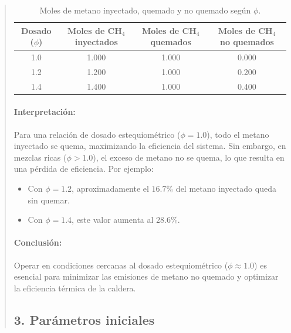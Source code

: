 \documentclass[11pt, a4paper]{article}
\begin{document}
\begin{quote}
\begin{center}
\begin{adjustwidth}{-1.7cm}{-1cm}
\begin{table}[h!]
\centering
\begin{tabular}{|c|c|c|c|}
\hline
\textbf{Dosado (\(\phi\))} & \textbf{Moles de CH$_4$ inyectados} & \textbf{Moles de CH$_4$ quemados} & \textbf{Moles de CH$_4$ no quemados} \\ \hline
1.0                        & 1.000                               & 1.000                            & 0.000                              \\ \hline
1.2                        & 1.200                               & 1.000                            & 0.200                              \\ \hline
1.4                        & 1.400                               & 1.000                            & 0.400                              \\ \hline
\end{tabular}
\caption{Moles de metano inyectado, quemado y no quemado según \(\phi\).}
\label{tab:metano_inquemado}
\end{table}

\paragraph{Interpretación:}
Para una relación de dosado estequiométrico (\(\phi = 1.0\)), todo el metano inyectado se quema, maximizando la eficiencia del sistema. Sin embargo, en mezclas ricas (\(\phi > 1.0\)), el exceso de metano no se quema, lo que resulta en una pérdida de eficiencia. Por ejemplo:
\begin{itemize}
    \item Con \(\phi = 1.2\), aproximadamente el \(16.7\%\) del metano inyectado queda sin quemar.
    \item Con \(\phi = 1.4\), este valor aumenta al \(28.6\%\).
\end{itemize}

\paragraph{Conclusión:}
Operar en condiciones cercanas al dosado estequiométrico (\(\phi \approx 1.0\)) es esencial para minimizar las emisiones de metano no quemado y optimizar la eficiencia térmica de la caldera.


\subsection*{3. Parámetros iniciales}


\end{adjustwidth}
\end{center}
\end{quote}
\end{document}

